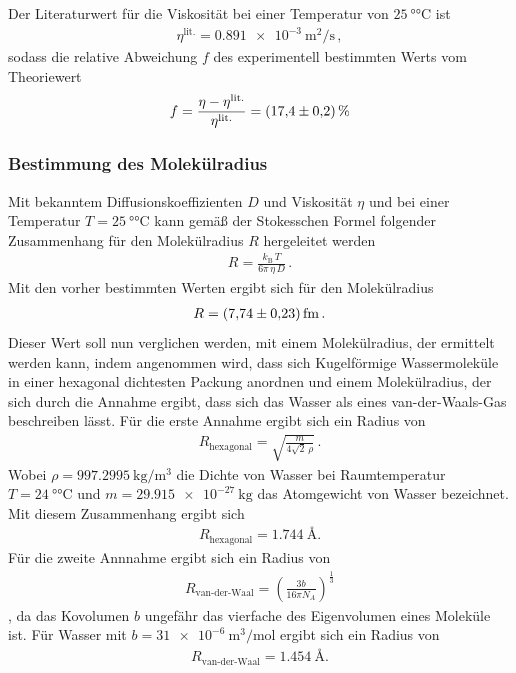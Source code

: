 Der Literaturwert\cite{litvisk} für die Viskosität bei einer Temperatur von $\SI{25}{\degree\celsius}$ ist
\begin{align*}
  \eta^\text{lit.} = \SI{0.891e-3}{\meter\squared\per\second} \, ,
\end{align*}
sodass die relative Abweichung $f$ des experimentell bestimmten Werts
vom Theoriewert
\begin{align*}
  f = \frac{\eta - \eta^\text{lit.}}{\eta^\text{lit.}} = \SI{17.4+-0.2}{\percent}
\end{align*}


\FloatBarrier
\subsubsection{Bestimmung des Molekülradius}
\label{subsubsec:molekuelradius}
Mit bekanntem Diffusionskoeffizienten $D$ und Viskosität $\eta$
und bei einer Temperatur $T=\SI{25}{\degree\celsius}$
kann gemäß
der Stokesschen Formel folgender Zusammenhang für den Molekülradius $R$ hergeleitet werden
\begin{align}
  \label{eqn:stokes}
  R = \frac{k_\text{B} \, T}{6 \pi \, \eta \, D} \, .
\end{align}
Mit den vorher bestimmten Werten ergibt sich für den Molekülradius
\begin{align*}
  R = \SI{7.74+-0.23}{\femto\meter} \, .
\end{align*}
Dieser Wert soll nun verglichen werden, mit einem Molekülradius, der ermittelt werden kann,
indem angenommen wird, dass sich
Kugelförmige Wassermoleküle in einer hexagonal dichtesten Packung anordnen
und einem Molekülradius, der sich durch die Annahme ergibt, dass sich das Wasser als eines van-der-Waals-Gas
beschreiben lässt.
Für die erste Annahme ergibt sich ein Radius von
\begin{align*}
  R_{\text{hexagonal}} = \sqrt{\frac{m}{4\sqrt{2} \, \rho}} \, .
\end{align*}
Wobei $\rho=\SI{997.2995}{\kilo\gram\per\meter\tothe{3}}$  \cite{litdicht} die Dichte von Wasser bei Raumtemperatur $T=\SI{24}{\degree\celsius}$
und $m=\SI{29.915e-27}{\kilo\gram}$ \cite{litatomgewicht} das Atomgewicht von Wasser bezeichnet.
Mit diesem Zusammenhang ergibt sich
\begin{align*}
  R_{\text{hexagonal}} = \SI{1.744}{\angstrom}.
\end{align*}
Für die zweite Annnahme ergibt sich ein Radius von
\begin{align}
R_{\text{van-der-Waal}}= \left(\frac{3b}{16\pi N_A}\right)^{\frac{1}{3}}
\end{align}
, da das Kovolumen $b$ ungefähr das
vierfache des Eigenvolumen eines Moleküle ist.
Für Wasser mit $b=\SI{31e-6}{\meter\tothe{3}\per\mol}$ \cite{litwaal} ergibt sich ein Radius von
\begin{align}
R_{\text{van-der-Waal}}= \SI{1.454}{\angstrom}.
\end{align}

